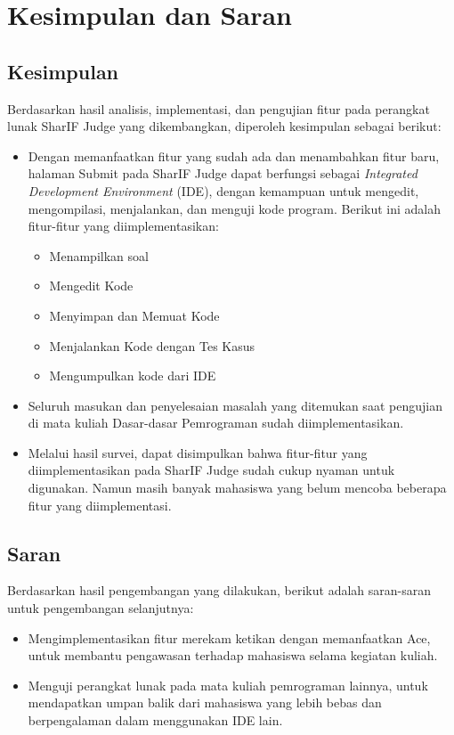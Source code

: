 \chapter{Kesimpulan dan Saran}
\label{chap:kesimpulandansaran}

\section{Kesimpulan}
\label{sec:6:kesimpulan}

Berdasarkan hasil analisis, implementasi, dan pengujian fitur pada perangkat lunak SharIF Judge yang dikembangkan, diperoleh kesimpulan sebagai berikut:

\begin{itemize}
    \item Dengan memanfaatkan fitur yang sudah ada dan menambahkan fitur baru, halaman Submit pada SharIF Judge dapat berfungsi sebagai {\it Integrated Development Environment} (IDE), dengan kemampuan untuk mengedit, mengompilasi, menjalankan, dan menguji kode program. Berikut ini adalah fitur-fitur yang diimplementasikan:
    \begin{itemize}
        \item Menampilkan soal
        \item Mengedit Kode
        \item Menyimpan dan Memuat Kode
        \item Menjalankan Kode dengan Tes Kasus
        \item Mengumpulkan kode dari IDE
    \end{itemize}
    
    \item Seluruh masukan dan penyelesaian masalah yang ditemukan saat pengujian di mata kuliah Dasar-dasar Pemrograman sudah diimplementasikan.
    
    \item Melalui hasil survei, dapat disimpulkan bahwa fitur-fitur yang diimplementasikan pada SharIF Judge sudah cukup nyaman untuk digunakan. Namun masih banyak mahasiswa yang belum mencoba beberapa fitur yang diimplementasi.
\end{itemize}

\section{Saran}
\label{sec:6:saran}

Berdasarkan hasil pengembangan yang dilakukan, berikut adalah saran-saran untuk pengembangan selanjutnya:

\begin{itemize}
    \item Mengimplementasikan fitur merekam ketikan dengan memanfaatkan Ace, untuk membantu pengawasan terhadap mahasiswa selama kegiatan kuliah.
    \item Menguji perangkat lunak pada mata kuliah pemrograman lainnya, untuk mendapatkan umpan balik dari mahasiswa yang lebih bebas dan berpengalaman dalam menggunakan IDE lain.
\end{itemize}